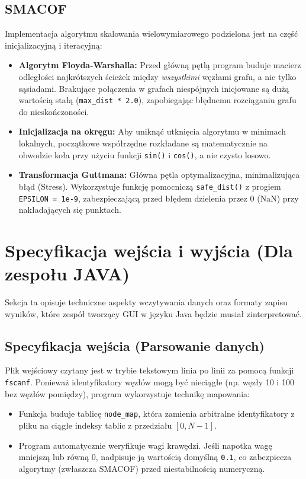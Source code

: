 \documentclass[12pt,a4paper]{article}
\begin{document}
\subsection{SMACOF}
Implementacja algorytmu skalowania wielowymiarowego podzielona jest na część inicjalizacyjną i iteracyjną:
\begin{itemize}
    \item \textbf{Algorytm Floyda-Warshalla:} Przed główną pętlą program buduje macierz odległości najkrótszych ścieżek między \textit{wszystkimi} węzłami grafu, a nie tylko sąsiadami. Brakujące połączenia w grafach niespójnych inicjowane są dużą wartością stałą (\texttt{max\_dist * 2.0}), zapobiegając błędnemu rozciąganiu grafu do nieskończoności.
    \item \textbf{Inicjalizacja na okręgu:} Aby uniknąć utknięcia algorytmu w minimach lokalnych, początkowe współrzędne rozkładane są matematycznie na obwodzie koła przy użyciu funkcji \texttt{sin()} i \texttt{cos()}, a nie czysto losowo.
    \item \textbf{Transformacja Guttmana:} Główna pętla optymalizacyjna, minimalizująca błąd (Stress). Wykorzystuje funkcję pomocniczą \texttt{safe\_dist()} z progiem \texttt{EPSILON = 1e-9}, zabezpieczającą przed błędem dzielenia przez 0 (NaN) przy nakładających się punktach.
\end{itemize}

\section{Specyfikacja wejścia i wyjścia (Dla zespołu JAVA)}
Sekcja ta opisuje techniczne aspekty wczytywania danych oraz formaty zapisu wyników, które zespół tworzący GUI w języku Java będzie musiał zinterpretować.

\subsection{Specyfikacja wejścia (Parsowanie danych)}
Plik wejściowy czytany jest w trybie tekstowym linia po linii za pomocą funkcji \texttt{fscanf}. Ponieważ identyfikatory węzłów mogą być nieciągłe (np. węzły 10 i 100 bez węzłów pomiędzy), program wykorzystuje technikę mapowania:
\begin{itemize}
    \item Funkcja buduje tablicę \texttt{node\_map}, która zamienia arbitralne identyfikatory z pliku na ciągłe indeksy tablic z przedziału $[0, N-1]$.
    \item Program automatycznie weryfikuje wagi krawędzi. Jeśli napotka wagę mniejszą lub równą $0$, nadpisuje ją wartością domyślną \texttt{0.1}, co zabezpiecza algorytmy (zwłaszcza SMACOF) przed niestabilnością numeryczną.
\end{itemize}
\end{document}
